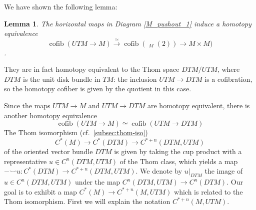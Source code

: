 \documentclass{scrartcl}
\theoremstyle{plain}
\newtheorem{lemma}[theorem]{Lemma}
\theoremstyle{definition}
\newcommand{\cupp}{\mathbin{\smile}}
\DeclareMathOperator{\cone}{cone}
\DeclareMathOperator{\cofib}{cofib}
\newcommand{\quiso}{\simeq}
\let\xto\xrightarrow
\DeclareMathOperator{\cConf}{\overline{Conf}}
\newcommand{\blank}{-}
\begin{document}

We have shown the following lemma:
\begin{lemma}\label{lem:M-cofib-hteq}
    The horizontal maps in Diagram \ref{M_pushout_1} induce a homotopy equivalence $$\cofib(UTM\to M) \xto{\quiso} \cofib(\cConf_M(2))\to M\times M)$$.
\end{lemma}


They are in fact homotopy equivalent to the Thom space $DTM / UTM$, where $DTM$ is the unit disk bundle in $TM$: the inclusion $UTM\to DTM$ is a cofibration, so the homotopy cofiber is given by the quotient in this case. 

Since the maps $UTM\to M$ and $UTM\to DTM$ are homotopy equivalent, there is another homotopy equivalence
$$\cofib(UTM\to M)\quiso \cofib(UTM\to DTM)$$
The Thom isomorphism (cf.\ \cref{subsec:thom-iso}) $$C^*(M) \to C^*(DTM)\to C^{*+n}(DTM, UTM)$$of the oriented vector bundle $DTM$ is given by taking the cup product with a representative $u\in C^n(DTM, UTM)$ of the Thom class, which yields a map $\blank\cupp u\colon C^*(DTM)\to C^{*+n}(DTM, UTM)$. We denote by $u|_{DTM}$ the image of $u\in C^n(DTM, UTM)$ under the map $C^n(DTM, UTM)\to C^n(DTM)$. Our goal is to exhibit a map $C^*(M)\to C^{*+n}(M, UTM)$ which is related to the Thom isomorphism. First we will explain the notation $C^{*+n}(M, UTM)$.
\end{document}
